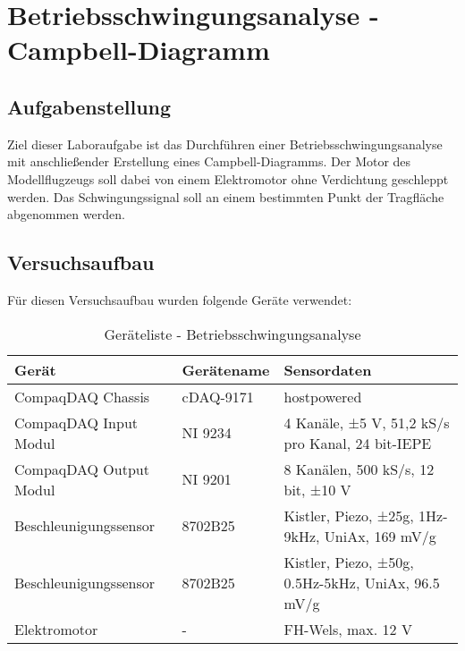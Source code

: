 \chapter{Betriebsschwingungsanalyse - Campbell-Diagramm}
\label{sec: Hauptkapitel 2}


\section{Aufgabenstellung}
    Ziel dieser Laboraufgabe ist das Durchführen einer Betriebsschwingungsanalyse
    mit anschließender Erstellung eines Campbell-Diagramms. Der Motor des
    Modellflugzeugs soll dabei von einem Elektromotor ohne Verdichtung
    geschleppt werden. Das Schwingungssignal soll an einem bestimmten Punkt der
    Tragfläche abgenommen werden.

\section{Versuchsaufbau}
    Für diesen Versuchsaufbau wurden folgende Geräte verwendet:

    \begin{table}[H]
        \centering
        \begin{tabular}{|l|l|p{6cm}|}
            \hline
            \textbf{Gerät}  &   \textbf{Gerätename}   &   \textbf{Sensordaten} \\
            \hline \hline
            CompaqDAQ Chassis & cDAQ-9171 & hostpowered \\
            \hline
            CompaqDAQ Input Modul & NI 9234 & 4 Kanäle, ±5 V, 51,2 kS/s pro Kanal, 24 bit-IEPE  \\
            \hline
            CompaqDAQ Output Modul & NI 9201 & 8 Kanälen, 500 kS/s, 12 bit, ±10 V   \\
            \hline
            Beschleunigungssensor & 8702B25 & Kistler, Piezo, ±25g, 1Hz-9kHz, UniAx, 169 mV/g  \\
            \hline
            Beschleunigungssensor & 8702B25 & Kistler, Piezo, ±50g, 0.5Hz-5kHz, UniAx, 96.5 mV/g  \\
            \hline
            Elektromotor & - & FH-Wels, max. 12 V \\
            \hline
        \end{tabular}
        \caption{Geräteliste - Betriebsschwingungsanalyse}
        \label{tab: Geräteliste_BSA}
    \end{table}

